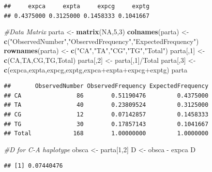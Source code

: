 \documentclass[]{article}
\newenvironment{Shaded}{\begin{snugshade}}{\end{snugshade}}
\newcommand{\KeywordTok}[1]{\textcolor[rgb]{0.13,0.29,0.53}{\textbf{{#1}}}}
\newcommand{\DecValTok}[1]{\textcolor[rgb]{0.00,0.00,0.81}{{#1}}}
\newcommand{\StringTok}[1]{\textcolor[rgb]{0.31,0.60,0.02}{{#1}}}
\newcommand{\CommentTok}[1]{\textcolor[rgb]{0.56,0.35,0.01}{\textit{{#1}}}}
\newcommand{\OtherTok}[1]{\textcolor[rgb]{0.56,0.35,0.01}{{#1}}}
\newcommand{\NormalTok}[1]{{#1}}
\begin{document}
\begin{verbatim}
##     expca     expta     expcg     exptg 
## 0.4375000 0.3125000 0.1458333 0.1041667
\end{verbatim}

\begin{Shaded}
\begin{Highlighting}[]
\CommentTok{#Data Matrix}
\NormalTok{parta <-}\StringTok{ }\KeywordTok{matrix}\NormalTok{(}\OtherTok{NA}\NormalTok{,}\DecValTok{5}\NormalTok{,}\DecValTok{3}\NormalTok{)}
\KeywordTok{colnames}\NormalTok{(parta) <-}\StringTok{ }\KeywordTok{c}\NormalTok{(}\StringTok{"ObservedNumber"}\NormalTok{,}\StringTok{"ObservedFrequency"}\NormalTok{,}\StringTok{"ExpectedFrequency"}\NormalTok{)}
\KeywordTok{rownames}\NormalTok{(parta) <-}\StringTok{ }\KeywordTok{c}\NormalTok{(}\StringTok{"CA"}\NormalTok{,}\StringTok{"TA"}\NormalTok{,}\StringTok{"CG"}\NormalTok{,}\StringTok{"TG"}\NormalTok{,}\StringTok{"Total"}\NormalTok{)}
\NormalTok{parta[,}\DecValTok{1}\NormalTok{] <-}\StringTok{ }\KeywordTok{c}\NormalTok{(CA,TA,CG,TG,Total)}
\NormalTok{parta[,}\DecValTok{2}\NormalTok{] <-}\StringTok{ }\NormalTok{parta[,}\DecValTok{1}\NormalTok{]/Total}
\NormalTok{parta[,}\DecValTok{3}\NormalTok{] <-}\StringTok{ }\KeywordTok{c}\NormalTok{(expca,expta,expcg,exptg,expca+expta+expcg+exptg)}
\NormalTok{parta}
\end{Highlighting}
\end{Shaded}

\begin{verbatim}
##       ObservedNumber ObservedFrequency ExpectedFrequency
## CA                86        0.51190476         0.4375000
## TA                40        0.23809524         0.3125000
## CG                12        0.07142857         0.1458333
## TG                30        0.17857143         0.1041667
## Total            168        1.00000000         1.0000000
\end{verbatim}

\begin{Shaded}
\begin{Highlighting}[]
\CommentTok{#D for C-A haplotype}
\NormalTok{obsca <-}\StringTok{ }\NormalTok{parta[}\DecValTok{1}\NormalTok{,}\DecValTok{2}\NormalTok{]}
\NormalTok{D <-}\StringTok{ }\NormalTok{obsca -}\StringTok{ }\NormalTok{expca}
\NormalTok{D}
\end{Highlighting}
\end{Shaded}

\begin{verbatim}
## [1] 0.07440476
\end{verbatim}
\end{document}
